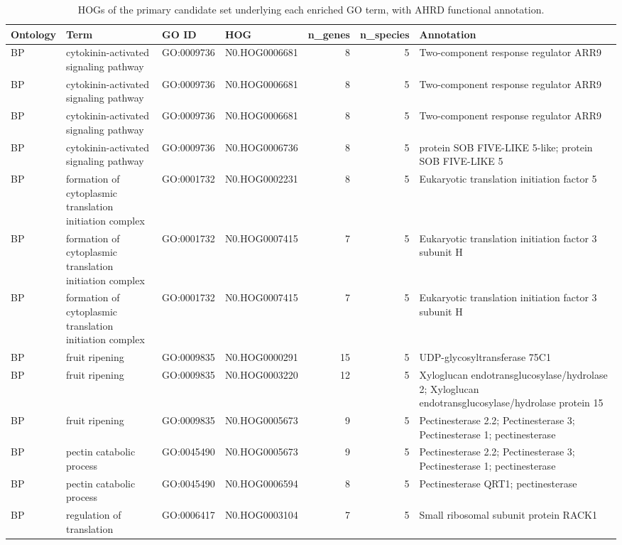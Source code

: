 \begin{table}

\caption{HOGs of the primary candidate set underlying each enriched GO term, with AHRD functional annotation.}
\centering
\begin{tabular}[t]{llllrrl}
\toprule
Ontology & Term & GO ID & HOG & n\_genes & n\_species & Annotation\\
\midrule
BP & cytokinin-activated signaling pathway & GO:0009736 & N0.HOG0006681 & 8 & 5 & Two-component response regulator ARR9\\
BP & cytokinin-activated signaling pathway & GO:0009736 & N0.HOG0006681 & 8 & 5 & Two-component response regulator ARR9\\
BP & cytokinin-activated signaling pathway & GO:0009736 & N0.HOG0006681 & 8 & 5 & Two-component response regulator ARR9\\
BP & cytokinin-activated signaling pathway & GO:0009736 & N0.HOG0006736 & 8 & 5 & protein SOB FIVE-LIKE 5-like; protein SOB FIVE-LIKE 5\\
BP & formation of cytoplasmic translation initiation complex & GO:0001732 & N0.HOG0002231 & 8 & 5 & Eukaryotic translation initiation factor 5\\
BP & formation of cytoplasmic translation initiation complex & GO:0001732 & N0.HOG0007415 & 7 & 5 & Eukaryotic translation initiation factor 3 subunit H\\
BP & formation of cytoplasmic translation initiation complex & GO:0001732 & N0.HOG0007415 & 7 & 5 & Eukaryotic translation initiation factor 3 subunit H\\
BP & fruit ripening & GO:0009835 & N0.HOG0000291 & 15 & 5 & UDP-glycosyltransferase 75C1\\
BP & fruit ripening & GO:0009835 & N0.HOG0003220 & 12 & 5 & Xyloglucan endotransglucosylase/hydrolase 2; Xyloglucan endotransglucosylase/hydrolase protein 15\\
BP & fruit ripening & GO:0009835 & N0.HOG0005673 & 9 & 5 & Pectinesterase 2.2; Pectinesterase 3; Pectinesterase 1; pectinesterase\\
BP & pectin catabolic process & GO:0045490 & N0.HOG0005673 & 9 & 5 & Pectinesterase 2.2; Pectinesterase 3; Pectinesterase 1; pectinesterase\\
BP & pectin catabolic process & GO:0045490 & N0.HOG0006594 & 8 & 5 & Pectinesterase QRT1; pectinesterase\\
BP & regulation of translation & GO:0006417 & N0.HOG0003104 & 7 & 5 & Small ribosomal subunit protein RACK1\\

\end{tabular}
\end{table}
